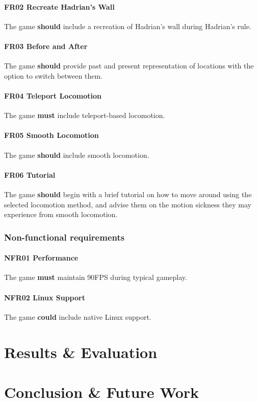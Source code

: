 \documentclass[sigconf,authordraft]{acmart}
\begin{document}
\paragraph{FR02 Recreate Hadrian's Wall}
The game \textbf{should} include a recreation of Hadrian's wall during Hadrian's
rule.

\paragraph{FR03 Before and After}
The game \textbf{should} provide past and present representation of locations
with the option to switch between them.

\paragraph{FR04 Teleport Locomotion}
The game \textbf{must} include teleport-based locomotion.

\paragraph{FR05 Smooth Locomotion}
The game \textbf{should} include smooth locomotion.

\paragraph{FR06 Tutorial}
The game \textbf{should} begin with a brief tutorial on how to move around
using the selected locomotion method, and advise them on the motion sickness
they may experience from smooth locomotion.

\subsubsection{Non-functional requirements}

\paragraph{NFR01 Performance}
The game \textbf{must} maintain 90FPS during typical gameplay.

\paragraph{NFR02 Linux Support}
The game \textbf{could} include native Linux support.

\section{Results \& Evaluation}

\section{Conclusion \& Future Work}

\begin{acks}

\end{acks}




\appendix
\end{document}
